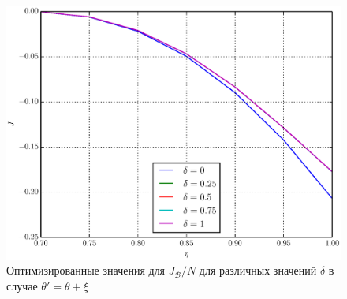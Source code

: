 \documentclass[%
master,         %
subf,           %
href,           %
colorlinks=true %
]{disser}
\numberwithin{equation}{section}
\numberwithin{figure}{section}
\begin{document}
\begin{figure}[t]
\includegraphics[scale=0.7]{J_ang.eps}
\caption{Оптимизированные значения для $J_{\mathcal{B}}/N$ для различных значений $\delta$ в случае $\theta' = \theta + \xi$}
\label{fig:J_ang}
\end{figure}


\begingroup
\small
\end{document}

